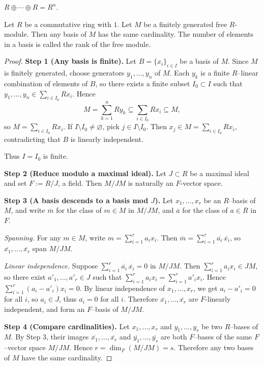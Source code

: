 \documentclass[11pt, a4paper]{report}
\begin{document}
\begin{example}
$R \oplus \cdots \oplus R = R^{n}$.
\end{example}

\begin{theorem}
Let $R$ be a commutative ring with $1$. Let $M$ be a finitely generated free $R$-module. Then any basis of $M$ has the same cardinality. The number of elements in a basis is called the rank of the free module.
\end{theorem}

\begin{proof}
\textbf{Step 1 (Any basis is finite).}
Let $B=\{x_i\}_{i\in I}$ be a basis of $M$. Since $M$ is finitely generated, choose
generators $y_1,\dots,y_n$ of $M$. Each $y_k$ is a finite $R$--linear combination of elements
of $B$, so there exists a finite subset $I_0\subset I$ such that
$y_1,\dots,y_n\in \sum_{i\in I_0}Rx_i$. Hence
\[
M=\sum_{k=1}^n Ry_k \subseteq \sum_{i\in I_0}Rx_i \subseteq M,
\]
so $M=\sum_{i\in I_0}Rx_i$. If $I\setminus I_0\neq\varnothing$, pick $j\in I\setminus I_0$.
Then $x_j\in M=\sum_{i\in I_0}Rx_i$, contradicting that $B$ is linearly independent.

Thus $I=I_0$ is finite. 

\textbf{Step 2 (Reduce modulo a maximal ideal).}
Let $J\subset R$ be a maximal ideal and set $F:=R/J$, a field. Then $M/JM$ is naturally an $F$-vector space.

\textbf{Step 3 (A basis descends to a basis mod $J$).}
Let $x_1,\dots,x_r$ be an $R$--basis of $M$, and write $\overline{m}$ for the class of
$m\in M$ in $M/JM$, and $\overline{a}$ for the class of $a\in R$ in $F$.

\emph{Spanning.} For any $m\in M$, write $m=\sum_{i=1}^r a_i x_i$. Then
$\overline{m}=\sum_{i=1}^r \overline{a_i}\,\overline{x_i}$, so $\overline{x_1},\dots,\overline{x_r}$
span $M/JM$.

\emph{Linear independence.} Suppose $\sum_{i=1}^r \overline{a_i}\,\overline{x_i}=0$ in $M/JM$.
Then $\sum_{i=1}^r a_i x_i\in JM$, so there exist $a'_1,\dots,a'_r\in J$ such that
$\sum_{i=1}^r a_i x_i=\sum_{i=1}^r a'_i x_i$. Hence $\sum_{i=1}^r (a_i-a'_i)x_i=0$.
By linear independence of $x_1,\dots,x_r$, we get $a_i-a'_i=0$ for all $i$, so $a_i\in J$,
thus $\overline{a_i}=0$ for all $i$. Therefore $\overline{x_1},\dots,\overline{x_r}$ are
$F$-linearly independent, and form an $F$--basis of $M/JM$. 

\textbf{Step 4 (Compare cardinalities).}
Let $x_1,\dots,x_r$ and $y_1,\dots,y_s$ be two $R$--bases of $M$. By Step 3, their images
$\overline{x_1},\dots,\overline{x_r}$ and $\overline{y_1},\dots,\overline{y_s}$ are both $F$--bases
of the same $F$--vector space $M/JM$. Hence $r=\dim_F(M/JM)=s$. Therefore any two
bases of $M$ have the same cardinality.
\end{proof}
\end{document}
